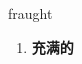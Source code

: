 
\begin{frame}
{\huge fraught}
\begin{center}
\begin{enumerate}\Large
  \item \textbf{充满的}
\end{enumerate}
\end{center}
\end{frame}
